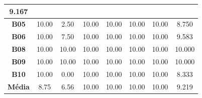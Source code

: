 \begin{table}[htbp]
\begin{tabular}{|c|ccccccc|}
		9.167 \\ \hline
		\rowcolor[HTML]{F2F2F2} 
		\textbf{B05} &
		\multicolumn{1}{c|}{\cellcolor[HTML]{F2F2F2}10.00} &
		\multicolumn{1}{c|}{\cellcolor[HTML]{F2F2F2}2.50} &
		\multicolumn{1}{c|}{\cellcolor[HTML]{F2F2F2}10.00} &
		\multicolumn{1}{c|}{\cellcolor[HTML]{F2F2F2}10.00} &
		\multicolumn{1}{c|}{\cellcolor[HTML]{F2F2F2}10.00} &
		\multicolumn{1}{c|}{\cellcolor[HTML]{F2F2F2}10.00} &
		8.750 \\ \hline
		\textbf{B06} &
		\multicolumn{1}{c|}{\cellcolor[HTML]{FFFFFF}10.00} &
		\multicolumn{1}{c|}{\cellcolor[HTML]{FFFFFF}7.50} &
		\multicolumn{1}{c|}{\cellcolor[HTML]{FFFFFF}10.00} &
		\multicolumn{1}{c|}{\cellcolor[HTML]{FFFFFF}10.00} &
		\multicolumn{1}{c|}{\cellcolor[HTML]{FFFFFF}10.00} &
		\multicolumn{1}{c|}{\cellcolor[HTML]{FFFFFF}10.00} &
		9.583 \\ \hline
		\rowcolor[HTML]{F2F2F2} 
		\textbf{B08} &
		\multicolumn{1}{c|}{\cellcolor[HTML]{F2F2F2}10.00} &
		\multicolumn{1}{c|}{\cellcolor[HTML]{F2F2F2}10.00} &
		\multicolumn{1}{c|}{\cellcolor[HTML]{F2F2F2}10.00} &
		\multicolumn{1}{c|}{\cellcolor[HTML]{F2F2F2}10.00} &
		\multicolumn{1}{c|}{\cellcolor[HTML]{F2F2F2}10.00} &
		\multicolumn{1}{c|}{\cellcolor[HTML]{F2F2F2}10.00} &
		10.000 \\ \hline
		\textbf{B09} &
		\multicolumn{1}{c|}{\cellcolor[HTML]{FFFFFF}10.00} &
		\multicolumn{1}{c|}{\cellcolor[HTML]{FFFFFF}10.00} &
		\multicolumn{1}{c|}{\cellcolor[HTML]{FFFFFF}10.00} &
		\multicolumn{1}{c|}{\cellcolor[HTML]{FFFFFF}10.00} &
		\multicolumn{1}{c|}{\cellcolor[HTML]{FFFFFF}10.00} &
		\multicolumn{1}{c|}{\cellcolor[HTML]{FFFFFF}10.00} &
		10.000 \\ \hline
		\rowcolor[HTML]{F2F2F2} 
		\textbf{B10} &
		\multicolumn{1}{c|}{\cellcolor[HTML]{F2F2F2}10.00} &
		\multicolumn{1}{c|}{\cellcolor[HTML]{F2F2F2}0.00} &
		\multicolumn{1}{c|}{\cellcolor[HTML]{F2F2F2}10.00} &
		\multicolumn{1}{c|}{\cellcolor[HTML]{F2F2F2}10.00} &
		\multicolumn{1}{c|}{\cellcolor[HTML]{F2F2F2}10.00} &
		\multicolumn{1}{c|}{\cellcolor[HTML]{F2F2F2}10.00} &
		8.333 \\ \hline
		\rowcolor[HTML]{D0CECE} 
		\textbf{Média} &
		\multicolumn{1}{c|}{\cellcolor[HTML]{D0CECE}8.75} &
		\multicolumn{1}{c|}{\cellcolor[HTML]{D0CECE}6.56} &
		\multicolumn{1}{c|}{\cellcolor[HTML]{D0CECE}10.00} &
		\multicolumn{1}{c|}{\cellcolor[HTML]{D0CECE}10.00} &
		\multicolumn{1}{c|}{\cellcolor[HTML]{D0CECE}10.00} &
		\multicolumn{1}{c|}{\cellcolor[HTML]{D0CECE}10.00} &
		9.219 \\ \hline
	\end{tabular}
	\label{tab:F3_A3_NP_AVALIACAO}
\end{table}

